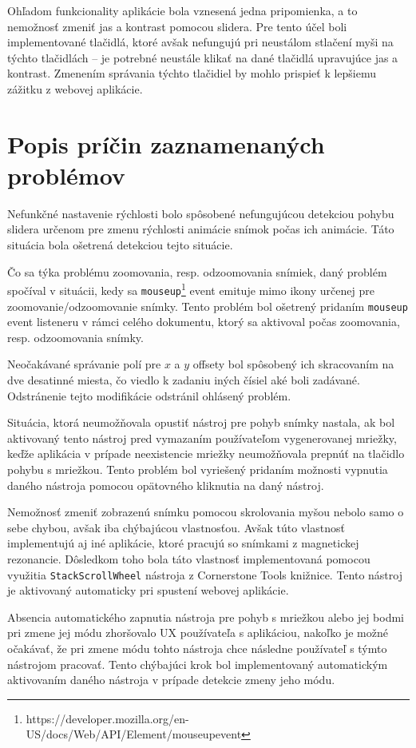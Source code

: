Ohľadom funkcionality aplikácie bola vznesená jedna pripomienka, a to nemožnosť zmeniť jas a kontrast pomocou slidera. Pre tento účel boli implementované tlačidlá, ktoré avšak nefungujú pri neustálom stlačení myši na týchto tlačidlách -- je potrebné neustále klikať na dané tlačidlá upravujúce jas a kontrast. Zmenením správania týchto tlačidiel by mohlo prispieť k lepšiemu zážitku z webovej aplikácie.

\section {Popis príčin zaznamenaných problémov}
Nefunkčné nastavenie rýchlosti bolo spôsobené nefungujúcou detekciou pohybu slidera určenom pre zmenu rýchlosti animácie snímok počas ich animácie. Táto situácia bola ošetrená detekciou tejto situácie.

Čo sa týka problému zoomovania, resp. odzoomovania snímiek, daný problém spočíval v situácii, kedy sa \texttt{mouseup}\footnote{https://developer.mozilla.org/en-US/docs/Web/API/Element/mouseup\textunderscore event} event emituje mimo ikony určenej pre zoomovanie/odzoomovanie snímky. Tento problém bol ošetrený pridaním \texttt{mouseup} event listeneru v rámci celého dokumentu, ktorý sa aktivoval počas zoomovania, resp. odzoomovania snímky.

\clearpage

Neočakávané správanie polí pre $x$ a $y$ offsety bol spôsobený ich skracovaním na dve desatinné miesta, čo viedlo k zadaniu iných čísiel aké boli zadávané. Odstránenie tejto modifikácie odstránil ohlásený problém.

Situácia, ktorá neumožňovala opustiť nástroj pre pohyb snímky nastala, ak bol aktivovaný tento nástroj pred vymazaním používateľom vygenerovanej mriežky, keďže aplikácia v prípade neexistencie mriežky neumožňovala prepnúť na tlačidlo pohybu s mriežkou. Tento problém bol vyriešený pridaním možnosti vypnutia daného nástroja pomocou opätovného kliknutia na daný nástroj.

Nemožnosť zmeniť zobrazenú snímku pomocou skrolovania myšou nebolo samo o sebe chybou, avšak iba chýbajúcou vlastnosťou. Avšak túto vlastnosť implementujú aj iné aplikácie, ktoré pracujú so snímkami z magnetickej rezonancie. Dôsledkom toho bola táto vlastnosť implementovaná pomocou využitia \texttt{StackScrollWheel} nástroja z Cornerstone Tools knižnice. Tento nástroj je aktivovaný automaticky pri spustení webovej aplikácie.

Absencia automatického zapnutia nástroja pre pohyb s mriežkou alebo jej bodmi pri zmene jej módu zhoršovalo UX používateľa s aplikáciou, nakoľko je možné očakávať, že pri zmene módu tohto nástroja chce následne používateľ s týmto nástrojom pracovať. Tento chýbajúci krok bol implementovaný automatickým aktivovaním daného nástroja v prípade detekcie zmeny jeho módu.

